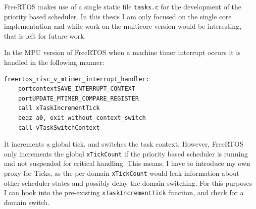 FreeRTOS makes use of a single static file \texttt{tasks.c} for the development
of the priority based scheduler. In this thesis I am only focused on the single
core implementation and while work on the multicore version would be
interesting, that is left for future work.

In the MPU version of FreeRTOS when a machine timer interrupt occurs it is
handled in the following manner:

\begin{lstlisting}[language={[RISC-V]Assembler}, caption={FreeRTOS mtimer interrupt handler}, label={lst:interrupt}]
freertos_risc_v_mtimer_interrupt_handler:
    portcontextSAVE_INTERRUPT_CONTEXT
    portUPDATE_MTIMER_COMPARE_REGISTER
    call xTaskIncrementTick
    beqz a0, exit_without_context_switch 
    call vTaskSwitchContext
\end{lstlisting}

It increments a global tick, and switches the task context. However, FreeRTOS
only increments the global \texttt{xTickCount} if the priority based scheduler
is running and not suspended for critical handling. This means, I have to
introduce my own proxy for Ticks, as the per domain \texttt{xTickCount} would
leak information about other scheduler states and possibly delay the domain
switching. For this purposes I can hook into the pre-existing
\texttt{xTaskIncrementTick} function, and check for a domain switch.

